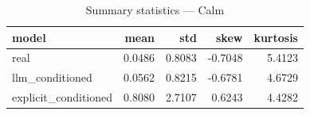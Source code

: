 \begin{table}
\caption{Summary statistics — Calm}
\label{tab:summary_Calm}
\begin{tabular}{lrrrr}
\toprule
model & mean & std & skew & kurtosis \\
\midrule
real & 0.0486 & 0.8083 & -0.7048 & 5.4123 \\
llm\_conditioned & 0.0562 & 0.8215 & -0.6781 & 4.6729 \\
explicit\_conditioned & 0.8080 & 2.7107 & 0.6243 & 4.4282 \\
\bottomrule
\end{tabular}
\end{table}
